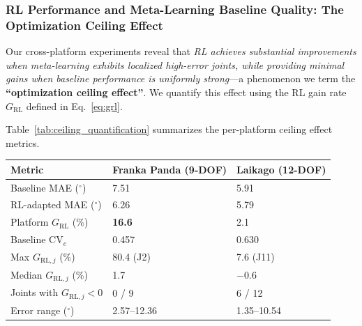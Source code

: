 \documentclass[DTMColor]{ROB-New}
\begin{document}
{\color{blue}\subsubsection{RL Performance and Meta-Learning Baseline Quality: The Optimization Ceiling Effect}

Our cross-platform experiments reveal that \textit{RL achieves substantial improvements when meta-learning exhibits localized high-error joints, while providing minimal gains when baseline performance is uniformly strong}---a phenomenon we term the \textbf{``optimization ceiling effect''}. We quantify this effect using the RL gain rate $G_{\mathrm{RL}}$ defined in Eq.~\ref{eq:grl}.

Table~\ref{tab:ceiling_quantification} summarizes the per-platform ceiling effect metrics.
}

\begin{table}[htbp]
{\begin{fntable}\centering
\begin{tabular}{@{\extracolsep{\fill}}lll}
\hline
\textbf{Metric} & \textbf{Franka Panda (9-DOF)} & \textbf{Laikago (12-DOF)} \\
\hline
Baseline MAE ($^\circ$)         & 7.51             & 5.91             \\
RL-adapted MAE ($^\circ$)       & 6.26             & 5.79             \\
Platform $G_{\mathrm{RL}}$ (\%)              & \textbf{16.6}    & 2.1              \\
Baseline $\mathrm{CV}_e$                     & 0.457            & 0.630            \\
Max $G_{\mathrm{RL},j}$ (\%)           & 80.4 (J2)        & 7.6 (J11)        \\
Median $G_{\mathrm{RL},j}$ (\%)         & 1.7              & $-$0.6           \\
Joints with $G_{\mathrm{RL},j} < 0$     & 0 / 9            & 6 / 12           \\
Error range ($^\circ$)          & 2.57--12.36      & 1.35--10.54      \\
\hline
\end{tabular}
\end{fntable}}
\end{table}
\end{document}
